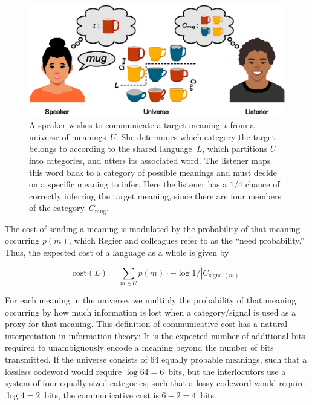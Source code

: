 \documentclass[a4paper, 11pt]{article}
\begin{document}
	\begin{figure}
	\begin{center}
	\includegraphics[]{comm_cost_discrete.eps}
	\caption{A speaker wishes to communicate a target meaning~$t$ from a universe of meanings~$U$. She determines which category the target belongs to according to the shared language~$L$, which partitions $U$ into categories, and utters its associated word. The listener maps this word back to a category of possible meanings and must decide on a specific meaning to infer. Here the listener has a $1/4$ chance of correctly inferring the target meaning, since there are four members of the category~$C_\mathrm{mug}$.}
	\label{fg_comm_cost_discrete}
	\end{center}
	\end{figure}

The cost of sending a meaning is modulated by the probability of that meaning occurring $p(m)$, which Regier and colleagues refer to as the ``need probability.'' Thus, the expected cost of a language as a whole is given by

	\begin{equation}
	\mathrm{cost}(L) = \sum_{m \in U} p(m) \cdot -\log 1 / |C_{\mathrm{signal}(m)}|
	\label{eq_cost_discrete}
	\end{equation}

\noindent
For each meaning in the universe, we multiply the probability of that meaning occurring by how much information is lost when a category/signal is used as a proxy for that meaning. This definition of communicative cost has a natural interpretation in information theory: It is the expected number of additional bits required to unambiguously encode a meaning beyond the number of bits transmitted. If the universe consists of 64 equally probable meanings, such that a lossless codeword would require $\log 64 = 6$~bits, but the interlocutors use a system of four equally sized categories, such that a lossy codeword would require $\log 4 = 2$~bits, the communicative cost is $6 - 2 = 4$~bits.
\end{document}
